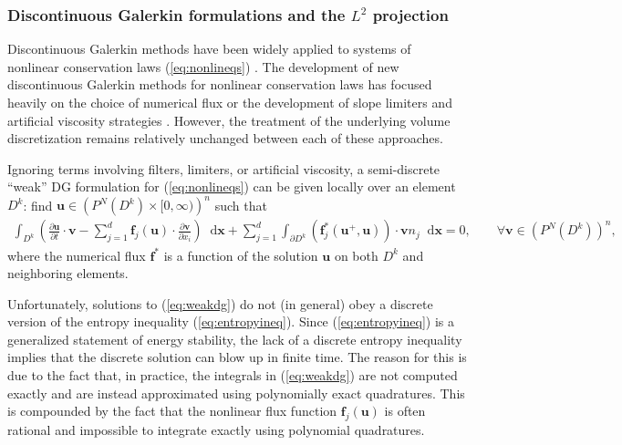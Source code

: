 \documentclass[10pt]{amsart}
\theoremstyle{definition}
\theoremstyle{lemma}
\theoremstyle{theorem}
\theoremstyle{assumption}
\newcommand{\pd}[2]{\frac{\partial#1}{\partial#2}}
\newcommand{\LRp}[1]{\left( #1 \right)}
\newcommand*\diff[1]{\mathop{}\!{\mathrm{d}#1}} %
\begin{document}
\subsubsection{Discontinuous Galerkin formulations and the $L^2$ projection}

Discontinuous Galerkin methods have been widely applied to systems of nonlinear conservation laws (\ref{eq:nonlineqs}) \cite{cockburn1989tvb, cockburn1998runge, cockburn2001devising}.  The development of new discontinuous Galerkin methods for nonlinear conservation laws has focused heavily on the choice of numerical flux \cite{qiu2006numerical} or the development of  slope limiters \cite{krivodonova2007limiters, zhang2012maximum} and artificial viscosity strategies \cite{persson2006sub, barter2010shock, klockner2011viscous}.  However, the treatment of the underlying volume discretization remains relatively unchanged between each of these approaches.  

Ignoring terms involving filters, limiters, or artificial viscosity, a semi-discrete ``weak'' DG formulation  for (\ref{eq:nonlineqs}) can be given locally over an element $D^k$: find $\bm{u}\in \LRp{P^N\LRp{D^k} \times [0,\infty)}^n$ such that
\begin{align}
\int_{D^k} \LRp{\pd{\bm{u}}{t}\cdot \bm{v} - \sum_{j=1}^d\bm{f}_j(\bm{u}) \cdot \pd{\bm{v}}{x_i}} \diff{\bm{x}} 
+ \sum_{j=1}^d \int_{\partial D^k} \LRp{\bm{f}^*_j\LRp{\bm{u}^+,\bm{u}} }\cdot \bm{v} n_j  \diff{\bm{x}} = 0, \qquad \forall \bm{v}\in \LRp{P^N\LRp{D^k}}^n,
\label{eq:weakdg}
\end{align}
where the numerical flux $\bm{f}^*$ is a function of the solution $\bm{u}$ on both $D^k$ and neighboring elements.  

Unfortunately, solutions to (\ref{eq:weakdg}) do not (in general) obey a discrete version of the entropy inequality (\ref{eq:entropyineq}).  Since (\ref{eq:entropyineq}) is a generalized statement of energy stability, the lack of a discrete entropy inequality implies that the discrete solution can blow up in finite time.  The reason for this is due to the fact that, in practice, the integrals in (\ref{eq:weakdg}) are not computed exactly and are instead approximated using polynomially exact quadratures.  This is compounded by the fact that the nonlinear flux function $\bm{f}_j\LRp{\bm{u}}$ is often rational and impossible to integrate exactly using polynomial quadratures.  
\end{document}
